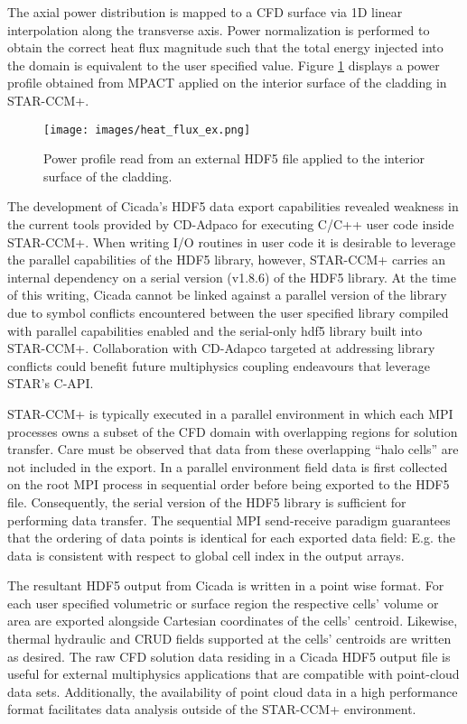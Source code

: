 \documentclass[10pt,a4paper]{report}
\begin{document}
The axial power distribution is mapped to a CFD surface via 1D linear interpolation along the transverse axis.  Power normalization is performed to obtain the correct heat flux magnitude such that the total energy injected into the domain is equivalent to the user specified value.   Figure \ref{heat_flux_ex} displays a power profile obtained from MPACT applied on the interior surface of the cladding in STAR-CCM+.

\begin{figure}[hbtp]
\centering
\texttt{[image: images/heat\_flux\_ex.png]}
\caption{Power profile read from an external HDF5 file applied to the interior surface of the cladding.}
\label{heat_flux_ex}
\end{figure}

The development of Cicada's HDF5 data export capabilities revealed weakness in the current tools provided by CD-Adpaco for executing C/C++ user code inside STAR-CCM+.  When writing I/O routines in user code it is desirable to leverage the parallel capabilities of the HDF5 library, however, STAR-CCM+ carries an internal dependency on a serial version (v1.8.6) of the HDF5 library.  At the time of this writing, Cicada cannot be linked against a parallel version of the library due to symbol conflicts encountered between the user specified library compiled with parallel capabilities enabled and the serial-only hdf5 library built into STAR-CCM+.
Collaboration with CD-Adapco targeted at addressing library conflicts could benefit future multiphysics coupling endeavours that leverage STAR's C-API.

STAR-CCM+ is typically executed in a parallel environment in which each MPI processes owns a subset of the CFD domain with overlapping regions for solution transfer.  Care must be observed that data from these overlapping ``halo cells'' are not included in the export.  In a parallel environment field data is first collected on the root MPI process in sequential order before being exported to the HDF5 file.  Consequently, the serial version of the HDF5 library is sufficient for performing data transfer.  The sequential MPI send-receive paradigm guarantees that the ordering of data points is identical for each exported data field: E.g. the data is consistent with respect to global cell index in the output arrays.   

The resultant HDF5 output from Cicada is written in a point wise format.  For each user specified volumetric or surface region the respective cells' volume or area are exported alongside Cartesian coordinates of the cells' centroid.  Likewise, thermal hydraulic and CRUD fields supported at the cells' centroids are written as desired.  The raw CFD solution data residing in a Cicada HDF5 output file is useful for external multiphysics applications that are compatible with point-cloud data sets.  Additionally, the availability of point cloud data in a high performance format facilitates data analysis outside of the STAR-CCM+ environment.  
\end{document}
